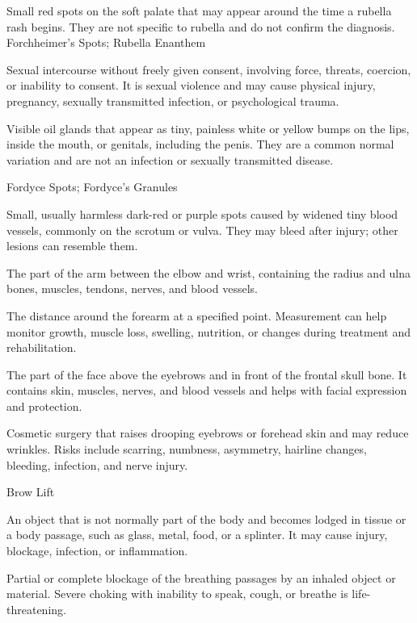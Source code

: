  Small red spots on the soft palate that may appear around the time a rubella rash begins. They are not specific to rubella and do not confirm the diagnosis.
\synonyms
Forchheimer's Spots; Rubella Enanthem

 Sexual intercourse without freely given consent, involving force, threats, coercion, or inability to consent. It is sexual violence and may cause physical injury, pregnancy, sexually transmitted infection, or psychological trauma.

 Visible oil glands that appear as tiny, painless white or yellow bumps on the lips, inside the mouth, or genitals, including the penis. They are a common normal variation and are not an infection or sexually transmitted disease.

\synonyms
Fordyce Spots; Fordyce's Granules

 Small, usually harmless dark-red or purple spots caused by widened tiny blood vessels, commonly on the scrotum or vulva. They may bleed after injury; other lesions can resemble them.

 The part of the arm between the elbow and wrist, containing the radius and ulna bones, muscles, tendons, nerves, and blood vessels.

 The distance around the forearm at a specified point. Measurement can help monitor growth, muscle loss, swelling, nutrition, or changes during treatment and rehabilitation.

 The part of the face above the eyebrows and in front of the frontal skull bone. It contains skin, muscles, nerves, and blood vessels and helps with facial expression and protection.

 Cosmetic surgery that raises drooping eyebrows or forehead skin and may reduce wrinkles. Risks include scarring, numbness, asymmetry, hairline changes, bleeding, infection, and nerve injury.

\synonyms
Brow Lift

 An object that is not normally part of the body and becomes lodged in tissue or a body passage, such as glass, metal, food, or a splinter. It may cause injury, blockage, infection, or inflammation.

 Partial or complete blockage of the breathing passages by an inhaled object or material. Severe choking with inability to speak, cough, or breathe is life-threatening.

